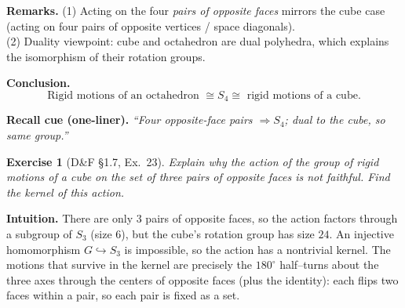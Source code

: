 \documentclass[12pt]{article}
\newtheorem{exercise}[theorem]{Exercise}
\theoremstyle{definition}
\begin{document}
\noindent\textbf{Remarks.}
(1) Acting on the four \emph{pairs of opposite faces} mirrors the cube case (acting on four pairs of opposite vertices / space diagonals).\\
(2) Duality viewpoint: cube and octahedron are dual polyhedra, which explains the isomorphism of their rotation groups.

\medskip
\noindent\textbf{Conclusion.}
\[
\boxed{\ \text{Rigid motions of an octahedron } \cong S_4 \cong \text{ rigid motions of a cube.}\ }
\]

\medskip
\noindent\textbf{Recall cue (one-liner).} \emph{“Four opposite-face pairs $\Rightarrow S_4$; dual to the cube, so same group.”}

\newpage

\begin{exercise}[D\&F §1.7, Ex.~23]
Explain why the action of the group of rigid motions of a cube on the set of three pairs of opposite faces is not faithful. Find the kernel of this action.
\end{exercise}

\dotfill

\noindent\textbf{Intuition.}
There are only $3$ pairs of opposite faces, so the action factors through a subgroup of $S_3$ (size $6$), 
but the cube’s rotation group has size $24$. An injective homomorphism $G\hookrightarrow S_3$ is impossible, 
so the action has a nontrivial kernel. The motions that survive in the kernel are precisely the $180^\circ$ 
half–turns about the three axes through the centers of opposite faces (plus the identity): each flips two faces within a pair, 
so each pair is fixed as a set.

\dotfill
\end{document}
